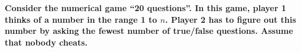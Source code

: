 \textbf{Consider the numerical game ``20 questions''. In this game, player 1 thinks of a number in the range 1 to $n$. Player 2 has to figure out this number by asking the fewest number of true/false questions. Assume that nobody cheats.}\vspace{.2cm}
